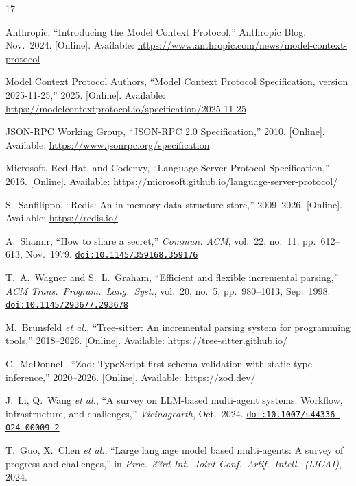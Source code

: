\documentclass[journal,10pt]{IEEEtran}
\newcommand{\doi}[1]{\href{https://doi.org/#1}{\texttt{doi:#1}}}
\begin{document}
\begin{thebibliography}{17}

Anthropic, ``Introducing the Model Context Protocol,'' Anthropic Blog, Nov.\ 2024. [Online]. Available: \url{https://www.anthropic.com/news/model-context-protocol}

Model Context Protocol Authors, ``Model Context Protocol Specification, version 2025-11-25,'' 2025. [Online]. Available: \url{https://modelcontextprotocol.io/specification/2025-11-25}

JSON-RPC Working Group, ``JSON-RPC 2.0 Specification,'' 2010. [Online]. Available: \url{https://www.jsonrpc.org/specification}

Microsoft, Red Hat, and Codenvy, ``Language Server Protocol Specification,'' 2016. [Online]. Available: \url{https://microsoft.github.io/language-server-protocol/}

S.~Sanfilippo, ``Redis: An in-memory data structure store,'' 2009--2026. [Online]. Available: \url{https://redis.io/}

A.~Shamir, ``How to share a secret,'' \emph{Commun. ACM}, vol.~22, no.~11, pp.~612--613, Nov.\ 1979. \doi{10.1145/359168.359176}

T.~A.~Wagner and S.~L.~Graham, ``Efficient and flexible incremental parsing,'' \emph{ACM Trans.\ Program.\ Lang.\ Syst.}, vol.~20, no.~5, pp.~980--1013, Sep.\ 1998. \doi{10.1145/293677.293678}

M.~Brunsfeld \emph{et al.}, ``Tree-sitter: An incremental parsing system for programming tools,'' 2018--2026. [Online]. Available: \url{https://tree-sitter.github.io/}

C.~McDonnell, ``Zod: TypeScript-first schema validation with static type inference,'' 2020--2026. [Online]. Available: \url{https://zod.dev/}

J.~Li, Q.~Wang \emph{et al.}, ``A survey on LLM-based multi-agent systems: Workflow, infrastructure, and challenges,'' \emph{Vicinagearth}, Oct.\ 2024. \doi{10.1007/s44336-024-00009-2}

T.~Guo, X.~Chen \emph{et al.}, ``Large language model based multi-agents: A survey of progress and challenges,'' in \emph{Proc.\ 33rd Int.\ Joint Conf.\ Artif.\ Intell.\ (IJCAI)}, 2024.


\end{thebibliography}
\end{document}
